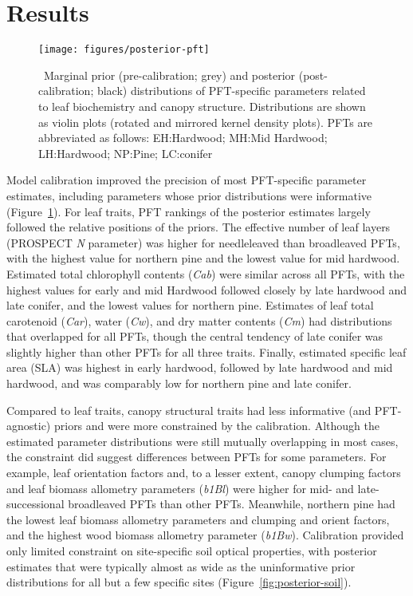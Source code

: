 \section{Results}

\begin{figure}
  \centering
  \texttt{[image: figures/posterior-pft]}
  \caption{\label{fig:posterior-pft}\
    Marginal prior (pre-calibration; grey) and posterior (post-calibration; black) distributions of PFT-specific parameters
    related to leaf biochemistry and canopy structure.
    Distributions are shown as violin plots (rotated and mirrored kernel density plots).
    PFTs are abbreviated as follows:
    EH:\@Early Hardwood;
    MH:\@North Mid Hardwood;
    LH:\@Late Hardwood;
    NP:\@Northern Pine;
    LC:\@Late conifer
  }
\end{figure}

Model calibration improved the precision of most PFT-specific parameter estimates, including parameters whose prior distributions were informative (Figure~\ref{fig:posterior-pft}).
For leaf traits, PFT rankings of the posterior estimates largely followed the relative positions of the priors.
The effective number of leaf layers (PROSPECT \emph{N} parameter) was higher for needleleaved than broadleaved PFTs, with the highest value for northern pine and the lowest value for mid hardwood.
Estimated total chlorophyll contents (\emph{Cab}) were similar across all PFTs, with the highest values for early and mid Hardwood followed closely by late hardwood and late conifer, and the lowest values for northern pine.
Estimates of leaf total carotenoid (\emph{Car}), water (\emph{Cw}), and dry matter contents (\emph{Cm}) had distributions that overlapped for all PFTs, though the central tendency of late conifer was slightly higher than other PFTs for all three traits.
Finally, estimated specific leaf area (SLA) was highest in early hardwood, followed by late hardwood and mid hardwood, and was comparably low for northern pine and late conifer.

Compared to leaf traits, canopy structural traits had less informative (and PFT-agnostic) priors and were more constrained by the calibration.
Although the estimated parameter distributions were still mutually overlapping in most cases, the constraint did suggest differences between PFTs for some parameters.
For example, leaf orientation factors and, to a lesser extent, canopy clumping factors and leaf biomass allometry parameters (\emph{b1Bl}) were higher for mid- and late-successional broadleaved PFTs than other PFTs.
Meanwhile, northern pine had the lowest leaf biomass allometry parameters and clumping and orient factors, and the highest wood biomass allometry parameter (\emph{b1Bw}).
Calibration provided only limited constraint on site-specific soil optical properties, with posterior estimates that were typically almost as wide as the uninformative prior distributions for all but a few specific sites (Figure~\ref{fig:posterior-soil}).


